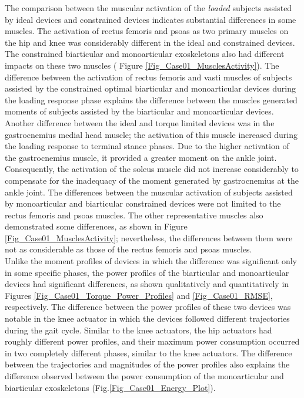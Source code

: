 \documentclass[10pt,letterpaper]{article}
\begin{document}
The comparison between the muscular activation of the {\it loaded} subjects assisted by ideal devices and constrained devices indicates substantial differences in some muscles. The activation of rectus femoris and psoas as two primary muscles on the hip and knee was considerably different in the ideal and constrained devices.  The constrained biarticular and monoarticular exoskeletons also had different impacts on these two muscles ( Figure \ref{Fig_Case01_MusclesActivity}). The difference between the activation of rectus femoris and vasti muscles of subjects assisted by the constrained optimal biarticular and monoarticular devices during the loading response phase explains the difference between the muscles generated moments of subjects assisted by the biarticular and monoarticular devices. Another difference between the ideal and torque limited devices was in the gastrocnemius medial head muscle; the activation of this muscle increased during the loading response to terminal stance phases. Due to the higher activation of the gastrocnemius muscle, it provided a greater moment on the ankle joint. Consequently, the activation of the soleus muscle did not increase considerably to compensate for the inadequacy of the moment generated by gastrocnemius at the ankle joint.
The differences between the muscular activation of subjects assisted by monoarticular and biarticular constrained devices were not limited to the rectus femoris and psoas muscles. The other representative muscles also demonstrated some differences, as shown in Figure \ref{Fig_Case01_MusclesActivity}; nevertheless, the differences between them were not as considerable as those of the rectus femoris and psoas muscles.\\
Unlike the moment profiles of devices in which the difference was significant only in some specific phases, the power profiles of the biarticular and monoarticular devices had significant differences, as shown qualitatively and quantitatively in Figures \ref{Fig_Case01_Torque_Power_Profiles} and \ref{Fig_Case01_RMSE}, respectively. The difference between the power profiles of these two devices was notable in the knee actuator in which the devices followed different trajectories during the gait cycle. Similar to the knee actuators, the hip actuators had roughly different power profiles, and their maximum power consumption occurred in two completely different phases, similar to the knee actuators.  The difference between the trajectories and magnitudes of the power profiles also explains the difference observed between the power consumption of the monoarticular and biarticular exoskeletons (Fig.\ref{Fig_Case01_Energy_Plot}).\\
\end{document}
